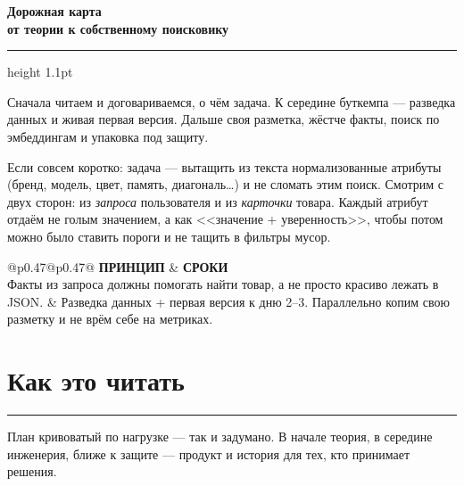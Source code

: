 \documentclass[11pt,a4paper]{article}
\newcommand{\secrule}{%
  \par\vspace{4pt}%
  {\color{mvred}\noindent\rule{\linewidth}{0.9pt}\par}%
  \vspace{8pt}%
}
\begin{document}
\pagecolor{paper}
\color{ink}


\vspace{0.35cm}
{\fontsize{24}{28}\selectfont\bfseries Дорожная карта}\\[0.08cm]
{\fontsize{13}{16}\selectfont\color{mvred}\bfseries от теории к собственному поисковику}

\vspace{0.28cm}
{\color{mvred}\hrule height 1.1pt}
\vspace{0.32cm}

Сначала читаем и договариваемся, о чём задача.
К середине буткемпа --- разведка данных и живая первая версия.
Дальше своя разметка, жёстче факты, поиск по эмбеддингам и упаковка под защиту.

\vspace{0.15cm}
Если совсем коротко: задача --- вытащить из текста нормализованные атрибуты (бренд, модель, цвет, память, диагональ\ldots) и не сломать этим поиск. Смотрим с двух сторон: из \emph{запроса} пользователя и из \emph{карточки} товара. Каждый атрибут отдаём не голым значением, а как <<значение + уверенность>>, чтобы потом можно было ставить пороги и не тащить в фильтры мусор.

\vspace{0.3cm}
\noindent
\begin{tabular}{@{}p{0.47\textwidth}@{\hspace{0.06\textwidth}}p{0.47\textwidth}@{}}
{\scriptsize\bfseries\color{inksoft}ПРИНЦИП} &
{\scriptsize\bfseries\color{inksoft}СРОКИ}\\[2pt]
Факты из запроса должны помогать найти товар, а не просто красиво лежать в JSON. &
Разведка данных + первая версия к дню 2--3. Параллельно копим свою разметку и не врём себе на метриках.
\end{tabular}

\vspace{0.4cm}
\section*{Как это читать}
\secrule
План кривоватый по нагрузке --- так и задумано.
В начале теория, в середине инженерия, ближе к защите --- продукт и история для тех, кто принимает решения.
\end{document}
